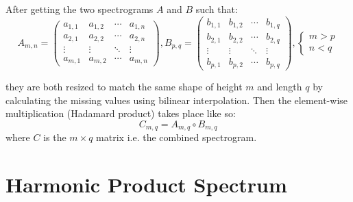 \documentclass[a4paper,12pt]{report}
\begin{document}
After getting the two spectrograms $A$ and $B$ such that:
\begin{equation}
A_{m,n} = 
 \begin{pmatrix}
  a_{1,1} & a_{1,2} & \cdots & a_{1,n} \\
  a_{2,1} & a_{2,2} & \cdots & a_{2,n} \\
  \vdots  & \vdots  & \ddots & \vdots  \\
  a_{m,1} & a_{m,2} & \cdots & a_{m,n} 
 \end{pmatrix},
 B_{p,q} = 
 \begin{pmatrix}
  b_{1,1} & b_{1,2} & \cdots & b_{1,q} \\
  b_{2,1} & b_{2,2} & \cdots & b_{2,q} \\
  \vdots  & \vdots  & \ddots & \vdots  \\
  b_{p,1} & b_{p,2} & \cdots & b_{p,q} 
 \end{pmatrix},
 \begin{cases}
 m > p \\
 n < q
 \end{cases}
\end{equation}

they are both resized to match the same shape of height $m$ and length $q$ by calculating the missing values using bilinear interpolation. Then the element-wise multiplication (Hadamard product) takes place like so:
\begin{equation}
C_{m,q} = A_{m,q} \circ B_{m,q}
\end{equation}
where $C$ is the $m \times q$ matrix i.e. the combined spectrogram.

\section{Harmonic Product Spectrum}
\label{hps}
\end{document}
